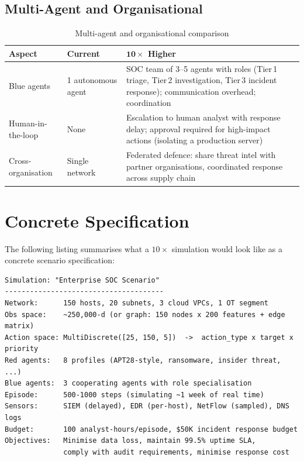 \documentclass[11pt,a4paper]{article}
\begin{document}
\subsection{Multi-Agent and Organisational}

\begin{table}[h!]
\centering
\caption{Multi-agent and organisational comparison}
\label{tab:multiagent}
\begin{tabularx}{\textwidth}{@{} l X X @{}}
\toprule
\textbf{Aspect} & \textbf{Current} & \textbf{$\mathbf{10\times}$ Higher} \\
\midrule
Blue agents & 1 autonomous agent &
    SOC team of 3--5 agents with roles (Tier\,1 triage, Tier\,2
    investigation, Tier\,3 incident response); communication overhead;
    coordination \\[3pt]
Human-in-the-loop & None &
    Escalation to human analyst with response delay; approval required
    for high-impact actions (isolating a production server) \\[3pt]
Cross-organisation & Single network &
    Federated defence: share threat intel with partner organisations,
    coordinated response across supply chain \\
\bottomrule
\end{tabularx}
\end{table}

\section{Concrete Specification}

The following listing summarises what a $10\times$ simulation would look like
as a concrete scenario specification:

\begin{lstlisting}[style=simspec]
Simulation: "Enterprise SOC Scenario"
--------------------------------------
Network:      150 hosts, 20 subnets, 3 cloud VPCs, 1 OT segment
Obs space:    ~250,000-d (or graph: 150 nodes x 200 features + edge matrix)
Action space: MultiDiscrete([25, 150, 5])  ->  action_type x target x priority
Red agents:   8 profiles (APT28-style, ransomware, insider threat, ...)
Blue agents:  3 cooperating agents with role specialisation
Episode:      500-1000 steps (simulating ~1 week of real time)
Sensors:      SIEM (delayed), EDR (per-host), NetFlow (sampled), DNS logs
Budget:       100 analyst-hours/episode, $50K incident response budget
Objectives:   Minimise data loss, maintain 99.5% uptime SLA,
              comply with audit requirements, minimise response cost
\end{lstlisting}
\end{document}
